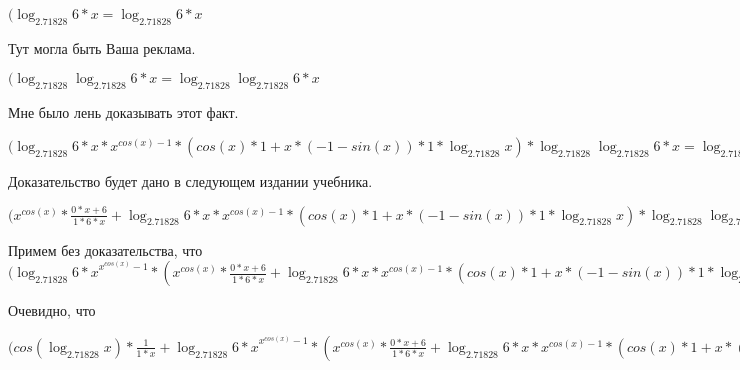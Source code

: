 \documentclass[12pt,a4paper,fleqn]{article}
\theoremstyle{definition}
\begin{document}
$(\log_{ 2.71828 }{ 6  *  x } = \log_{ 2.71828 }{ 6  *  x }$

Тут могла быть Ваша реклама.

$(\log_{ 2.71828 }{\log_{ 2.71828 }{ 6  *  x }} = \log_{ 2.71828 }{\log_{ 2.71828 }{ 6  *  x }}$

Мне было лень доказывать этот факт.

$(\log_{ 2.71828 }{ 6  *  x } * { x }^{cos( x ) -  1 } * (cos( x ) *  1  +  x  * ( -1  - sin( x )) *  1  * \log_{ 2.71828 }{ x }) * \log_{ 2.71828 }{\log_{ 2.71828 }{ 6  *  x }} = \log_{ 2.71828 }{ 6  *  x } * { x }^{cos( x ) -  1 } * (cos( x ) *  1  +  x  * ( -1  - sin( x )) *  1  * \log_{ 2.71828 }{ x }) * \log_{ 2.71828 }{\log_{ 2.71828 }{ 6  *  x }}$

Доказательство будет дано в следующем издании учебника.

$({ x }^{cos( x )} * \frac{ 0  *  x  +  6 }{ 1  *  6  *  x }
 + \log_{ 2.71828 }{ 6  *  x } * { x }^{cos( x ) -  1 } * (cos( x ) *  1  +  x  * ( -1  - sin( x )) *  1  * \log_{ 2.71828 }{ x }) * \log_{ 2.71828 }{\log_{ 2.71828 }{ 6  *  x }} = { x }^{cos( x )} * \frac{ 0  *  x  +  6 }{ 1  *  6  *  x }
 + \log_{ 2.71828 }{ 6  *  x } * { x }^{cos( x ) -  1 } * (cos( x ) *  1  +  x  * ( -1  - sin( x )) *  1  * \log_{ 2.71828 }{ x }) * \log_{ 2.71828 }{\log_{ 2.71828 }{ 6  *  x }}$

Примем без доказательства, что
$({\log_{ 2.71828 }{ 6  *  x }}^{{ x }^{cos( x )} -  1 } * ({ x }^{cos( x )} * \frac{ 0  *  x  +  6 }{ 1  *  6  *  x }
 + \log_{ 2.71828 }{ 6  *  x } * { x }^{cos( x ) -  1 } * (cos( x ) *  1  +  x  * ( -1  - sin( x )) *  1  * \log_{ 2.71828 }{ x }) * \log_{ 2.71828 }{\log_{ 2.71828 }{ 6  *  x }}) = {\log_{ 2.71828 }{ 6  *  x }}^{{ x }^{cos( x )} -  1 } * ({ x }^{cos( x )} * \frac{ 0  *  x  +  6 }{ 1  *  6  *  x }
 + \log_{ 2.71828 }{ 6  *  x } * { x }^{cos( x ) -  1 } * (cos( x ) *  1  +  x  * ( -1  - sin( x )) *  1  * \log_{ 2.71828 }{ x }) * \log_{ 2.71828 }{\log_{ 2.71828 }{ 6  *  x }})$

Очевидно, что

$(cos(\log_{ 2.71828 }{ x }) * \frac{ 1 }{ 1  *  x }
 + {\log_{ 2.71828 }{ 6  *  x }}^{{ x }^{cos( x )} -  1 } * ({ x }^{cos( x )} * \frac{ 0  *  x  +  6 }{ 1  *  6  *  x }
 + \log_{ 2.71828 }{ 6  *  x } * { x }^{cos( x ) -  1 } * (cos( x ) *  1  +  x  * ( -1  - sin( x )) *  1  * \log_{ 2.71828 }{ x }) * \log_{ 2.71828 }{\log_{ 2.71828 }{ 6  *  x }}) = cos(\log_{ 2.71828 }{ x }) * \frac{ 1 }{ 1  *  x }
 + {\log_{ 2.71828 }{ 6  *  x }}^{{ x }^{cos( x )} -  1 } * ({ x }^{cos( x )} * \frac{ 0  *  x  +  6 }{ 1  *  6  *  x }
 + \log_{ 2.71828 }{ 6  *  x } * { x }^{cos( x ) -  1 } * (cos( x ) *  1  +  x  * ( -1  - sin( x )) *  1  * \log_{ 2.71828 }{ x }) * \log_{ 2.71828 }{\log_{ 2.71828 }{ 6  *  x }})$
\end{document}
